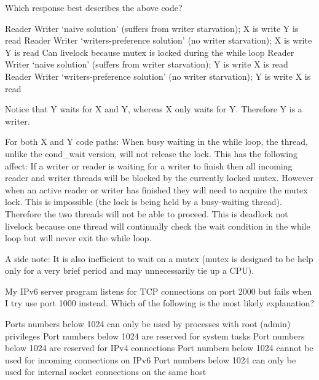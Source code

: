 Which response best describes the above code?
\begin{answers}
\answer Reader Writer `naive solution' (suffers from writer starvation); X is write Y is read
\answer Reader Writer `writers-preference solution' (no writer starvation); X is write Y is read
\correctanswer Can livelock because mutex is locked during the while loop
\answer Reader Writer `naive solution' (suffers from writer starvation); Y is write X is read
\answer Reader Writer `writers-preference solution'  (no writer starvation); Y is write X is read
\end{answers}
\begin{solution}
Notice that Y waits for X and Y, whereas X only waits for Y. Therefore Y is a writer.

For both X and Y code paths: When busy waiting in the while loop, the thread, unlike the cond_wait version, will not release the lock. This has the following affect:
If a writer or reader is waiting for a writer to finish then all incoming reader and writer threads will be blocked by the currently locked mutex.
However when an active reader or writer has finished they will need to acquire the mutex lock. This is impossible (the lock is being held by a busy-waiting thread). Therefore the two threads will not be able to proceed. This is deadlock not livelock because one thread will continually check the wait condition in the while loop but will never exit the while loop.

A side note: It is also inefficient to wait on a mutex (mutex is designed to be help only for a very brief period and may unnecessarily tie up a CPU).
\end{solution}


\variant
My IPv6 server program listens for TCP connections on port 2000 but fails when I try use port 1000 instead. Which of the following is the most likely explanation?
\begin{answers}
\correctanswer Ports numbers below 1024 can only be used by processes with root (admin) privileges
\answer Port numbers below 1024 are reserved for system tasks
\answer Port numbers below 1024 are reserved for IPv4 connections
\answer Port numbers below 1024 cannot be used for incoming connections on IPv6
\answer Port numbers below 1024 can only be used for internal socket connections on the same host
\end{answers}
\begin{solution}
\end{solution}

